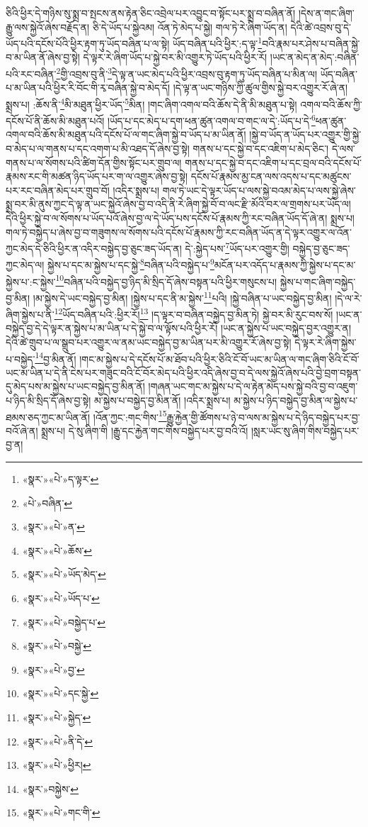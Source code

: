 ཅིའི་ཕྱིར་དེ་གཉིས་སུ་སྨྲ་བ་སྤངས་ནས་རྟེན་ཅིང་འབྲེལ་པར་འབྱུང་བ་སྟོང་པར་སྨྲ་བ་བཞིན་ནོ། །དེས་ན་གང་ཞིག་རྒྱུ་ལས་སྐྱེའོ་ཞེས་བརྗོད་ན། ཅི་དེ་ཡོད་པ་སྐྱེའམ། འོན་ཏེ་མེད་པ་སྐྱེ། གལ་ཏེ་རེ་ཞིག་ཡོད་ན། དེའི་ཚེ་འབྲས་བུ་དེ་ཡོད་པའི་དངོས་པོའི་ཕྱིར་རྟག་ཏུ་ཡོད་བཞིན་པ་ལ་སྟེ། ཡོད་བཞིན་པའི་ཕྱིར་:ད་ལྟ་\footnote{«སྣར་»«པེ་»ད་ལྟར་}བའི་རྣམ་པར་ཤེས་པ་བཞིན་སྐྱེ་བ་མ་ཡིན་ནོ་ཞེས་བྱ་སྟེ། དེ་ལྟར་རེ་ཞིག་ཡོད་པ་སྐྱེ་བར་མི་འགྱུར་ཏེ་ཡོད་པའི་ཕྱིར་རོ། །ཡང་ན་མེད་ན་མེད་:བཞིན་པའི་རང་བཞིན་\footnote{«པེ་»བཞིན་}གྱི་འབྲས་བུ་ནི་\footnote{«སྣར་»«པེ་»ན་}དེ་ལྟ་ན་ཡང་མེད་པའི་ཕྱིར་འབྲས་བུ་རྟག་ཏུ་ཡོད་བཞིན་པ་མིན་ལ། ཡོད་བཞིན་པ་མ་ཡིན་པའི་ཕྱིར་རི་བོང་གི་རྭ་བཞིན་སྐྱེ་བ་མེད་དོ། །དེ་ལྟ་ན་ཡང་གཉིས་ཀྱི་ཚུལ་གྱིས་སྐྱེ་བར་འགྱུར་རོ་ཞེ་ན། སྨྲས་པ། :ཆོས་ནི་\footnote{«སྣར་»«པེ་»ཆོས་}མི་མཐུན་ཕྱིར་ཡོད་\footnote{«སྣར་»«པེ་»ཡོད་མེད་}མིན། །གང་ཞིག་འགལ་བའི་ཆོས་དེ་ནི་མི་མཐུན་པ་སྟེ། འགལ་བའི་ཆོས་ཀྱི་དངོས་པོ་ནི་ཆོས་མི་མཐུན་པའོ། །ཡོད་པ་དང་མེད་པ་དག་ཕན་ཚུན་འགལ་བ་གང་ལ་དེ་:ཡོད་པ་དེ་\footnote{«སྣར་»«པེ་»ཡོད་པ་}ཕན་ཚུན་འགལ་བའི་ཆོས་མི་མཐུན་པའི་དངོས་པོ་ལ་གང་ཞིག་སྐྱེ་བ་ཡོད་པ་མ་ཡིན་ནོ། །སྐྱེ་བ་ཡོད་ན་ཡོད་པར་འགྱུར་གྱི་སྐྱེ་བ་མེད་པ་ལ་གནས་པ་དང་འགག་པ་མི་འཐད་དོ་ཞེས་བྱ་སྟེ། གནས་པ་དང་སྐྱེ་བ་དང་འཇིག་པ་མེད་ཅིང་། དེ་ལས་གནས་པ་ལ་སོགས་པའི་ཚིག་དོན་གྱིས་སྟོང་པར་གྲུབ་ལ། གནས་པ་དང་སྐྱེ་བ་དང་འཇིག་པ་དང་བྲལ་བའི་དངོས་པོ་རྣམས་རང་གི་མཚན་ཉིད་ཡོད་པར་ག་ལ་འགྱུར་ཞེས་བྱ་སྟེ། དངོས་པོ་རྣམས་མྱ་ངན་ལས་འདས་པ་དང་མཚུངས་པར་རང་བཞིན་མེད་པར་གྲུབ་བོ། །འདིར་སྨྲས་པ། གལ་ཏེ་ཡང་དེ་ལྟར་ཡོད་པ་ལས་སྐྱེ་བའམ་མེད་པ་ལས་སྐྱེ་ཞེས་སྨྲ་བར་མི་ནུས་ཀྱང་དེ་ལྟ་ན་ཡང་སྐྱེའོ་ཞེས་བྱ་བ་འདི་ནི་རེ་ཞིག་སྐྱེ་བོ་བ་ལང་རྫི་མོའི་བར་ལ་གྲགས་པར་ཡོད་ལ། དེའི་ཕྱིར་སྐྱེ་བ་ལ་སོགས་པ་ཡོད་པའོ་ཞེས་བྱ་ལ་དེ་ཡོད་པས་དངོས་པོ་རྣམས་ཀྱི་རང་བཞིན་ཡོད་དོ་ཞེ་ན། སྨྲས་པ། གལ་ཏེ་བསྐྱེད་པ་ཞེས་བྱ་བ་གཟུགས་ལ་སོགས་པའི་དངོས་པོ་རྣམས་ཀྱི་རང་བཞིན་ཡོད་ན་དེ་ལྟར་འགྱུར་ལ་འོན་ཀྱང་མེད་དེ་ཅིའི་ཕྱིར་ན་འདིར་བསྐྱེད་བྱ་ཅུང་ཟད་ཡོད་ན། དེ་:སྐྱེད་པས་\footnote{«སྣར་»«པེ་»བསྐྱེད་པ་}ཡོད་པར་འགྱུར་གྱི། བསྐྱེད་བྱ་ཅུང་ཟད་ཀྱང་མེད་ལ། སྐྱེས་པ་དང་མ་སྐྱེས་པ་དང་སྐྱེ་\footnote{«སྣར་»«པེ་»བསྐྱེ་}བཞིན་པའི་བསྐྱེད་པ་\footnote{«སྣར་»«པེ་»བྱ་}མངོན་པར་འདོད་པ་རྣམས་ཀྱི་སྐྱེས་པ་དང་མ་སྐྱེས་པ་:ང་སྐྱེས་\footnote{«སྣར་»«པེ་»དང་སྐྱེ་}བཞིན་པའི་བསྐྱེད་བྱ་ཉིད་མི་སྲིད་དོ་ཞེས་བསྟན་པའི་ཕྱིར་གསུངས་པ། སྐྱེས་པ་གང་ཞིག་བསྐྱེད་བྱ་མིན། །མ་སྐྱེས་དེ་ཡང་བསྐྱེད་བྱ་མིན། །སྐྱེས་པ་དང་ནི་མ་སྐྱེས་\footnote{«སྣར་»«པེ་»སྐྱེད་}པའི། །སྐྱེ་བཞིན་པ་ཡང་བསྐྱེད་བྱ་མིན། །དེ་ལ་རེ་ཞིག་སྐྱེས་པ་ནི་\footnote{«སྣར་»«པེ་»ནི་དེ་}ཡོད་བཞིན་པའི་:ཕྱིར་རོ།\footnote{«སྣར་»«པེ་»ཕྱིར།} །ད་ལྟར་བ་བཞིན་བསྐྱེད་བྱ་མིན་ཏེ། སྐྱེ་བར་མི་རུང་བས་སོ། །ཡང་ན་བསྐྱེད་བྱ་དེ་དེ་ལྟར་ན་སྐྱེས་པ་མ་ཡིན་པ་དེ་སྐྱེ་བ་ལ་ལྟོས་པའི་ཕྱིར་རོ། །ཡང་ན་སྐྱེས་པ་ཡང་བསྐྱེད་བྱར་འགྱུར་ན། དེའི་ཚེ་གྲུབ་པ་ལ་སྒྲུབ་པར་འགྱུར་ལ་ནམ་ཡང་བསྐྱེད་བྱ་མ་ཡིན་པར་མི་འགྱུར་རོ་ཞེས་བྱ་སྟེ། དེ་ལྟར་རེ་ཞིག་སྐྱེས་པ་བསྐྱེད་\footnote{«སྣར་»བསྐྱེས་}བྱ་མིན་ནོ། །གང་མ་སྐྱེས་པ་དེ་དངོས་པོ་མ་ཐོབ་པའི་ཕྱིར་ཅིའི་ངོ་བོ་ཡང་མ་ཡིན་ལ་གང་ཞིག་ཅིའི་ངོ་བོ་ཡང་མ་ཡིན་པ་དེ་ནི་ངེས་པར་གཟུང་བའི་ངོ་བོར་མེད་པའི་ཕྱིར་འདི་ཞེས་བྱ་བ་དེ་ལས་སྐྱེའོ་ཞེས་པའི་བྱེ་བྲག་བསྟན་དུ་མེད་པས་མ་སྐྱེས་པ་ཡང་བསྐྱེད་བྱ་མིན་ནོ། །གཞན་ཡང་གང་མ་སྐྱེས་པ་དེ་ལ་རྟེན་མེད་པས་སྐྱེ་བའི་བྱ་བ་འཇུག་པ་ཉིད་མི་སྲིད་དོ་ཞེས་བྱ་སྟེ། མ་སྐྱེས་པ་བསྐྱེད་བྱ་མིན་ནོ། །འདིར་སྨྲས་པ། མ་སྐྱེས་པ་ཉིད་བསྐྱེད་བྱ་མིན་ལ་སྐྱེས་པ་ཐམས་ཅད་ཀྱང་མ་ཡིན་ནོ། །འོན་ཀྱང་:གང་གིས་\footnote{«སྣར་»«པེ་»གང་གི་}རྒྱུ་རྐྱེན་གྱི་ཚོགས་པ་ཉེ་བ་ལས་མ་སྐྱེས་པ་དེ་ཉིད་བསྐྱེད་པར་བྱ་བའོ་ཞེ་ན། སྨྲས་པ། དེ་སུ་ཞིག་གི །རྒྱུ་དང་རྐྱེན་གང་གིས་བསྐྱེད་པར་བྱ་བའི་འོ། །སླར་ཡང་སུ་ཞིག་གིས་བསྐྱེད་པར་བྱ་ན། 